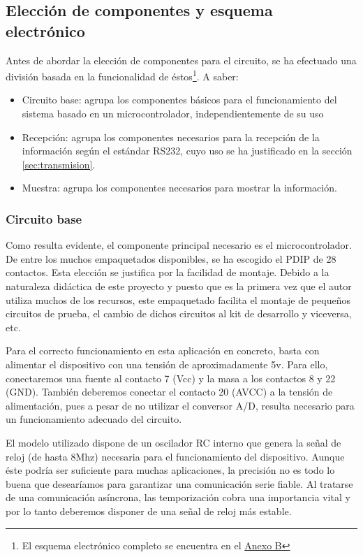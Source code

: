 \subsection{Elección de componentes y esquema electrónico}

Antes de abordar la elección de componentes para el circuito, se ha efectuado una división basada en la funcionalidad de éstos\footnote{El esquema electrónico completo se encuentra en el \hyperref[anexob]{Anexo B}}. A saber:

\begin{itemize}
  \item{Circuito base: agrupa los componentes básicos para el funcionamiento del sistema basado en un microcontrolador, independientemente de su uso}
  \item{Recepción: agrupa los componentes necesarios para la recepción de la información según el estándar RS232, cuyo uso se ha justificado en la sección \ref{sec:transmision}.}
  \item{Muestra: agrupa los componentes necesarios para mostrar la información.}
\end{itemize}

\subsubsection{Circuito base}

Como resulta evidente, el componente principal necesario es el microcontrolador. De entre los muchos empaquetados disponibles\cite{atmega48}, se ha escogido el PDIP de 28 contactos. Esta elección se justifica por la facilidad de montaje. Debido a la naturaleza didáctica de este proyecto y puesto que es la primera vez que el autor utiliza muchos de los recursos, este empaquetado facilita el montaje de pequeños circuitos de prueba, el cambio de dichos circuitos al kit de desarrollo y viceversa, etc.

Para el correcto funcionamiento en esta aplicación en concreto, basta con alimentar el dispositivo con una tensión de aproximadamente 5v. Para ello, conectaremos una fuente al contacto 7 (Vcc) y la masa a los contactos 8 y 22 (GND). También deberemos conectar el contacto 20 (AVCC) a la tensión de alimentación, pues a pesar de no utilizar el conversor A/D, resulta necesario para un funcionamiento adecuado del circuito.

El modelo utilizado dispone de un oscilador RC interno que genera la señal de reloj (de hasta 8Mhz) necesaria para el funcionamiento del dispositivo. Aunque éste podría ser suficiente para muchas aplicaciones, la precisión no es todo lo buena que desearíamos para garantizar una comunicación serie fiable. Al tratarse de una comunicación asíncrona, las temporización cobra una importancia vital y por lo tanto deberemos disponer de una señal de reloj más estable.

